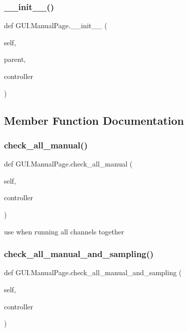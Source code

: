 \subsubsection{\texorpdfstring{\_\_init\_\_()}{\_\_init\_\_()}}
{\footnotesize\ttfamily def G\+U\+I.\+Manual\+Page.\+\_\+\+\_\+init\+\_\+\+\_\+ (\begin{DoxyParamCaption}\item[{}]{self,  }\item[{}]{parent,  }\item[{}]{controller }\end{DoxyParamCaption})}



\subsection{Member Function Documentation}
\mbox{\label{class_g_u_i_1_1_manual_page_aa7967ed411dd9846fd92f65b494972cf}} 
\subsubsection{\texorpdfstring{check\_all\_manual()}{check\_all\_manual()}}
{\footnotesize\ttfamily def G\+U\+I.\+Manual\+Page.\+check\+\_\+all\+\_\+manual (\begin{DoxyParamCaption}\item[{}]{self,  }\item[{}]{controller }\end{DoxyParamCaption})}

\begin{DoxyVerb}use when running all channels together
\end{DoxyVerb}
 \mbox{\label{class_g_u_i_1_1_manual_page_a4c34ad73eebd301c4981a02cf4e56daa}} 
\subsubsection{\texorpdfstring{check\_all\_manual\_and\_sampling()}{check\_all\_manual\_and\_sampling()}}
{\footnotesize\ttfamily def G\+U\+I.\+Manual\+Page.\+check\+\_\+all\+\_\+manual\+\_\+and\+\_\+sampling (\begin{DoxyParamCaption}\item[{}]{self,  }\item[{}]{controller }\end{DoxyParamCaption})}

